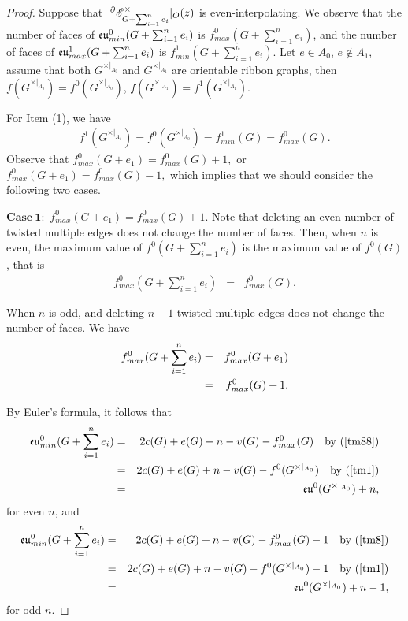 \begin{proof}Suppose that $~^{\partial}{{\mathscr{E}}}^{\times}_{G+\sum ^{n}_{i=1}e_{i}}|_O(z)$  is even-interpolating. We
observe that the number of faces of ${\mathfrak{eu}}^{0}_{min}(G +\sum ^{n}_{i=1}e_{i})$ is    $f^{0}_{max}(G +\sum ^{n}_{i=1}e_{i})$, and the number of faces of ${\mathfrak{eu}}^{1}_{max}(G +\sum ^{n}_{i=1}e_{i})$ is    $f^{1}_{min}(G +\sum ^{n}_{i=1}e_{i})$. Let $e\in A_0$, $e\notin A_1$,
 assume that both $G^{\times|_{A_{0}}}$ and  $G^{\times|_{A_{1}}}$ are  orientable ribbon graphs, then $f(G^{\times|_{A_{0}}})=f^{0}(G^{\times|_{A_{0}}})$, $f(G^{\times|_{A_{1}}})=f^{1}(G^{\times|_{A_{1}}})$.

For Item (1), we have  \begin{eqnarray}
f^{1}(G^{\times|_{A_{1}}})= f^{0}(G^{\times|_{A_{0}}})= f^{1}_{min}(G)= f^{0}_{max}(G).\label{tm1} \end{eqnarray}
 Observe that
$
f^{0}_{max}(G +e_{1})=
 f^{0}_{max}(G)+1,$ or
$f^{0}_{max}(G +e_{1})=
 f^{0}_{max}(G)-1,$
which implies that we should consider the following two cases.


$\mathbf{Case~ 1}:$
 $f^{0}_{max}(G +e_{1})=f^{0}_{max}(G)+1$. Note that  deleting an even number of twisted multiple edges does not change the number of faces. Then,  when $n$ is even, the maximum value of $f^{0}(G +\sum ^{n}_{i=1}e_{i})$ is the maximum value of  $f^{0}(G )$, that is
 \begin{eqnarray}
f^{0}_{max}(G +\sum ^{n}_{i=1}e_{i})&=& f^{0}_{max}(G ). \label{tm88}\end{eqnarray}

When $n$ is odd, and deleting  $n-1$  twisted multiple edges does not change the number of faces.
 We have
\begin{eqnarray}
f^{0}_{max}(G +\sum ^{n}_{i=1}e_{i})&=& f^{0}_{max}(G +e_{1})\label{tm8}\\
&=& f^{0}_{max}(G)+1.\notag \end{eqnarray}



By  Euler's formula, it follows that
 \begin{eqnarray}
{\mathfrak{eu}}^{0}_{min}(G +\sum ^{n}_{i=1}e_{i})&=& 2c(G)+e(G )+n-v(G )- f^{0}_{max}(G)\quad\text{by~(\ref{tm88})}\notag\\
&=& 2c(G)+e(G )+n-v(G )- f^{0}(G^{\times|_{A_{0}}})\quad\text{by~(\ref{tm1})} \notag\\
&=& {\mathfrak{eu}}^{0}(G^{\times|_{A_{0}}})+n,\label{tm08}
 \end{eqnarray} for even $n$, and
 \begin{eqnarray}
{\mathfrak{eu}}^{0}_{min}(G +\sum ^{n}_{i=1}e_{i})&=& 2c(G)+e(G )+n-v(G )- f^{0}_{max}(G)-1\quad\text{by~(\ref{tm8})}\notag\\
&=& 2c(G)+e(G )+n-v(G )- f^{0}(G^{\times|_{A_{0}}})-1\quad\text{by~(\ref{tm1})} \notag\\
&=& {\mathfrak{eu}}^{0}(G^{\times|_{A_{0}}})+n-1,\label{tm03}
 \end{eqnarray} for odd $n$.



\end{proof}
